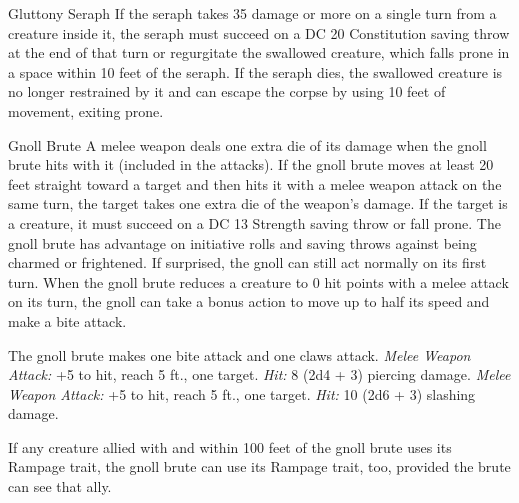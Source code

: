 \documentclass[10pt,a4paper,twoside,twocolumn,openany,bg=print,nodeprecatedcode]{dndbook}
\begin{document}
\begin{DndMonster}[float*=t]{Gluttony Seraph}
If the seraph takes 35 damage or more on a single turn from a creature inside it, the seraph must succeed on a DC 20 Constitution saving throw at the end of that turn or regurgitate the swallowed creature, which falls prone in a space within 10 feet of the seraph. If the seraph dies, the swallowed creature is no longer restrained by it and can escape the corpse by using 10 feet of movement, exiting prone.
\end{DndMonster}



\begin{DndMonster}[float*=t]{Gnoll Brute}
\DndMonsterBasics[
armor-class = {13 (natural armor)},
hit-points = {\DndDice{8d8 + 16}},
speed = {40 ft.}
]
\DndMonsterAbilityScores[
 str = 16,
 dex = 12,
 con = 15,
 int = 6,
 wis = 13,
 cha = 7
]
\DndMonsterDetails[
skills = {Athletics +5},
senses = {darkvision 60 ft., passive perception 11},
languages = {Gnoll},
challenge = 2,
]
A melee weapon deals one extra die of its damage when the gnoll brute hits with it (included in the attacks).
If the gnoll brute moves at least 20 feet straight toward a target and then hits it with a melee weapon attack on the same turn, the target takes one extra die of the weapon's damage. If the target is a creature, it must succeed on a DC 13 Strength saving throw or fall prone.
The gnoll brute has advantage on initiative rolls and saving throws against being charmed or frightened. If surprised, the gnoll can still act normally on its first turn.
When the gnoll brute reduces a creature to 0 hit points with a melee attack on its turn, the gnoll can take a bonus action to move up to half its speed and make a bite attack.
\par
{}
The gnoll brute makes one bite attack and one claws attack.
\textsl{Melee Weapon Attack:} +5 to hit, reach 5 ft., one target. \textsl{Hit:} 8 (2d4 + 3) piercing damage.
\textsl{Melee Weapon Attack:} +5 to hit, reach 5 ft., one target. \textsl{Hit:} 10 (2d6 + 3) slashing damage.
\par
{}
If any creature allied with and within 100 feet of the gnoll brute uses its Rampage trait, the gnoll brute can use its Rampage trait, too, provided the brute can see that ally.
\end{DndMonster}
\end{document}
